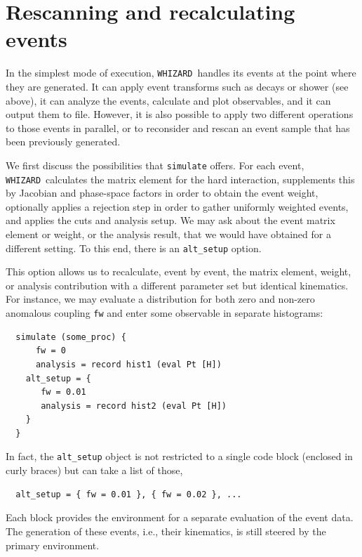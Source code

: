 \documentclass[12pt]{book}
\newcommand{\ttt}[1]{\texttt{#1}}
\newcommand{\whizard}{\ttt{WHIZARD}}
\begin{document}

\section{Rescanning and recalculating events}
\label{sec:rescan}

In the simplest mode of execution, \whizard\ handles its events at the
point where they are generated.  It can apply event transforms such as
decays or shower (see above), it can analyze the events, calculate and
plot observables, and it can output them to file.  However, it is also
possible to apply two different operations to those events in
parallel, or to reconsider and rescan an event sample that has been
previously generated.

We first discuss the possibilities that \ttt{simulate} offers.  For
each event, \whizard\ calculates the matrix element for the hard
interaction, supplements this by Jacobian and phase-space factors in
order to obtain the event weight, optionally applies a rejection step
in order to gather uniformly weighted events, and applies the
cuts and analysis setup.  We may ask about the event matrix element or
weight, or the analysis result, that we would have obtained for a
different setting.  To this end, there is an \ttt{alt\_setup} option.

This option allows us to recalculate, event by event, the matrix
element, weight, or analysis contribution with a different parameter
set but identical kinematics.  For instance, we may evaluate a
distribution for both zero and non-zero anomalous coupling \ttt{fw}
and enter some observable in separate histograms:

\begin{footnotesize}
\begin{verbatim}
  simulate (some_proc) {
      fw = 0
      analysis = record hist1 (eval Pt [H])
    alt_setup = {
       fw = 0.01
       analysis = record hist2 (eval Pt [H])
    }
  }
\end{verbatim}
\end{footnotesize}

In fact, the \ttt{alt\_setup} object is not restricted to a single
code block (enclosed in curly braces) but can take a list of those,
\begin{footnotesize}
\begin{verbatim}
  alt_setup = { fw = 0.01 }, { fw = 0.02 }, ...
\end{verbatim}
\end{footnotesize}
Each block provides the environment for a separate evaluation of the
event data.  The generation of these events, i.e., their kinematics,
is still steered by the primary environment.
\end{document}
